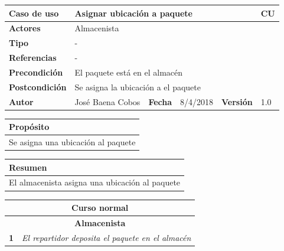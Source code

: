 \documentclass[12pt,spanish]{article}
\begin{document}
\begin{table}[H]
	\centering
	\begin{tabular}{|m{3cm}|m{4cm}|m{2cm}|m{2cm}|m{2cm}|m{1cm}|}
		\hline
		\textbf{Caso de uso} &  \multicolumn{4}{m{11cm}|}{Asignar ubicación a paquete} \vline &  \cellcolor{gray!40}CU\arabic{contadorCU}  \stepcounter{contadorCU} \\
		\hline
		\textbf{Actores} & \multicolumn{5}{m{11cm}|}{Almacenista} \\
		\hline
		\textbf{Tipo} & \multicolumn{5}{m{11cm}|}{-} \\
		\hline
		\textbf{Referencias} &\multicolumn{5}{m{11cm}|}{-} \\
		\hline
		\textbf{Precondición} & \multicolumn{5}{m{11cm}|}{El paquete está en el almacén} \\
		\hline
		\textbf{Postcondición} & \multicolumn{5}{m{11cm}|}{Se asigna la ubicación a el paquete} \\
		\hline
		\textbf{Autor} & José Baena Cobos & \textbf{Fecha} & 8/4/2018 & \textbf{Versión} & 1.0 \\
		\hline
	\end{tabular}
	
	\vspace{1cm}
	
	\begin{tabular}{|m{16.2cm}|}
		\hline
		\textbf{Propósito} \\
		\hline
		Se asigna una ubicación al paquete \\
		\hline
	\end{tabular}
	
	\vspace{1cm}
	
	\begin{tabular}{|m{16.2cm}|}
		\hline
		\textbf{Resumen} \\
		\hline
		El almacenista asigna una ubicación al paquete\\
		\hline
	\end{tabular}
	
	\vspace{1cm}
	
	\begin{tabular}{|m{5pt}|m{15.5cm}|}
		\hline
		\multicolumn{2}{|c|}{\textbf{Curso normal}} \\
		\hline
		\multicolumn{2}{|c|}{\textbf{Almacenista}} \\
		\hline
		\textbf{1} & \textit{El repartidor deposita el paquete en el almacén}\\
		\hline
		

\end{tabular}
\end{table}
\end{document}
